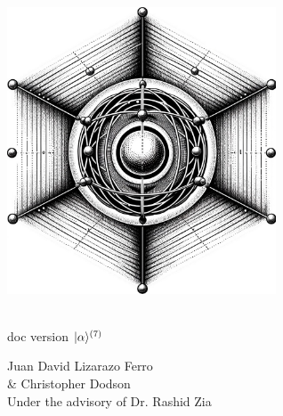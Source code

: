 \documentclass{article}
\begin{document}
 

\begin{titlepage} %
    \centering
    \vspace*{\fill}
    
    \includegraphics[width=0.6\textwidth]{ion_in_lattice.jpg} %
    \vspace*{1cm} %
    
    {\Large\qlanth}\\
    \vspace*{0.5cm}
    {\large doc version $|\alpha\rangle^{(7)}$}\\
    \vspace*{2cm}
    
    {\large Juan David Lizarazo Ferro}\\
    {\large \& Christopher Dodson}\\
    \vspace{0.5cm}
    {\large Under the advisory of Dr. Rashid Zia}\\
    \vspace*{\fill}
\end{titlepage}

\newpage

\

\cleardoublepage

\hypertarget{toc}{}

\vspace*{\fill}

\tableofcontents

\vspace*{\fill}

\newpage
\end{document}
